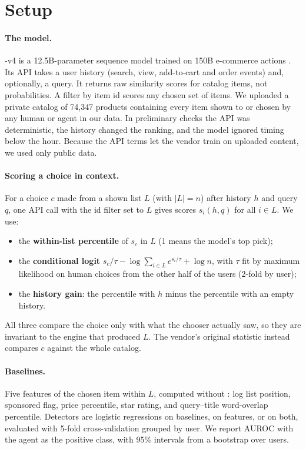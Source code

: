 \section{Setup}
\label{sec:setup}

\paragraph{The model.} \bgpt{}-v4 is a 12.5B-parameter sequence model trained on 150B e-commerce actions \cite{unbox2026docs}. Its API takes a user history (search, view, add-to-cart and order events) and, optionally, a query. It returns raw similarity scores for catalog items, not probabilities. A filter by item id scores any chosen set of items. We uploaded a private catalog of 74{,}347 products containing every item shown to or chosen by any human or agent in our data. In preliminary checks the API was deterministic, the history changed the ranking, and the model ignored timing below the hour. Because the API terms let the vendor train on uploaded content, we used only public data.

\paragraph{Scoring a choice in context.} For a choice $c$ made from a shown list $L$ (with $|L|=n$) after history $h$ and query $q$, one API call with the id filter set to $L$ gives scores $s_i(h,q)$ for all $i\in L$. We use:
\begin{itemize}
  \item the \textbf{within-list percentile} of $s_c$ in $L$ (1 means the model's top pick);
  \item the \textbf{conditional logit} $s_c/\tau-\log\sum_{i\in L}e^{s_i/\tau}+\log n$, with $\tau$ fit by maximum likelihood on human choices from the other half of the users (2-fold by user);
  \item the \textbf{history gain}: the percentile with $h$ minus the percentile with an empty history.
\end{itemize}
All three compare the choice only with what the chooser actually saw, so they are invariant to the engine that produced $L$. The vendor's original statistic instead compares $c$ against the whole catalog.

\paragraph{Baselines.} Five features of the chosen item within $L$, computed without \bgpt{}: log list position, sponsored flag, price percentile, star rating, and query--title word-overlap percentile. Detectors are logistic regressions on baselines, on \bgpt{} features, or on both, evaluated with 5-fold cross-validation grouped by user. We report AUROC with the agent as the positive class, with 95\% intervals from a bootstrap over users.

